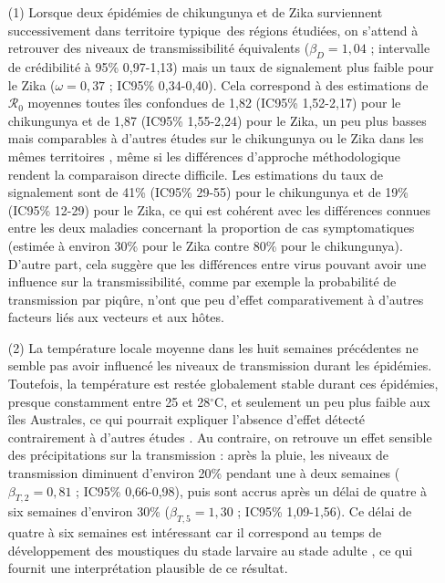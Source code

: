 \begin{itemize}
\item[(1)] Lorsque deux épidémies de chikungunya et de Zika surviennent successivement dans territoire \guillemotleft typique\guillemotright\ des régions étudiées, on s'attend à retrouver des niveaux de transmissibilité équivalents ($\beta_D=1,04$ ; intervalle de crédibilité à 95\% 0,97-1,13) mais un taux de signalement plus faible pour le Zika ($\omega=0,37$ ; IC95\% 0,34-0,40).
Cela correspond à des estimations de $\mathcal{R}_0$ moyennes toutes îles confondues de 1,82 (IC95\% 1,52-2,17) pour le chikungunya et de 1,87 (IC95\% 1,55-2,24) pour le Zika, un peu plus basses mais comparables à d'autres études sur le chikungunya ou le Zika dans les mêmes territoires \cite{kucharski2016transmission,Champagne064949,cauchemez2014local,nishiura2016transmission}, même si les différences d'approche méthodologique rendent la comparaison directe difficile.
Les estimations du taux de signalement sont de 41\% (IC95\% 29-55) pour le chikungunya et de 19\% (IC95\% 12-29) pour le Zika, ce qui est cohérent avec les différences connues entre les deux maladies concernant la proportion de cas symptomatiques (estimée à environ 30\% pour le Zika contre 80\% pour le chikungunya). 
D'autre part, cela suggère que les différences entre virus pouvant avoir une influence sur la transmissibilité, comme par exemple la probabilité de transmission par piqûre, n'ont que peu d'effet comparativement à d'autres facteurs liés aux vecteurs et aux hôtes.
\vspace{.3em}
\item[(2)] La température locale moyenne dans les huit semaines précédentes ne semble pas avoir influencé les niveaux de transmission durant les épidémies. Toutefois, la température est restée globalement stable durant ces épidémies, presque constamment entre 25 et 28$^{\circ}$C, et seulement un peu plus faible aux îles Australes, ce qui pourrait expliquer l'absence d'effet détecté contrairement à d'autres études \cite{li_rainfall_1985,barrera_population_2011,lu_time_2009}. Au contraire, on retrouve un effet sensible des précipitations sur la transmission : après la pluie, les niveaux de transmission diminuent d'environ 20\% pendant une à deux semaines ($\beta_{T,2}=0,81$ ; IC95\% 0,66-0,98), puis sont accrus après un délai de quatre à six semaines d'environ 30\% ($\beta_{T,5}=1,30$ ; IC95\% 1,09-1,56). Ce délai de quatre à six semaines est intéressant car il correspond au temps de développement des moustiques du stade larvaire au stade adulte \cite{barrera_population_2011}, ce qui fournit une interprétation plausible de ce résultat.

\end{itemize}

